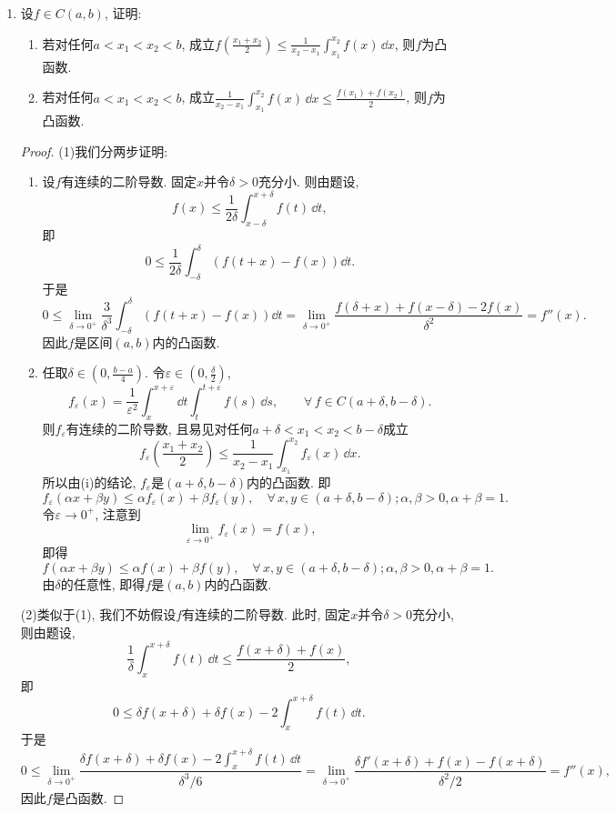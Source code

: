 \begin{quiza}
\begin{enumerate}
\item 设\(f\in C(a,b)\), 证明:
\begin{enumerate}[label=(\roman*)]
\item 若对任何\(a<x_1<x_2<b\), 成立\(f\left(\frac{x_1+x_2}{2}\right)
\leqslant\frac{1}{x_2-x_1}\int_{x_1}^{x_2}f(x)\,\dd x\), 则\(f\)为凸函数.
\item 若对任何\(a<x_1<x_2<b\), 成立\(\frac{1}{x_2-x_1}\int_{x_1}^{x_2}f(x)\,\dd x
\leqslant\frac{f(x_1)+f(x_2)}{2}\), 则\(f\)为凸函数.
\end{enumerate}
\begin{proof}
(1)我们分两步证明:
\begin{enumerate}[label=(\roman*)]
\item 设\(f\)有连续的二阶导数. 固定\(x\)并令\(\delta>0\)充分小. 则由题设,
\[f(x)\leqslant\frac{1}{2\delta}\int_{x-\delta}^{x+\delta}f(t)\,\dd t,\]
即\[0\leqslant\frac{1}{2\delta}\int_{-\delta}^{\delta}\left(f(t+x)-f(x)\right)\dd t.\]
于是\[0\leqslant\lim_{\delta\rightarrow 0^+}\frac{3}{\delta^3}\int_{-\delta}^{\delta}\left(f(t+x)-f(x)\right)\dd t
=\lim_{\delta\rightarrow 0^+}\frac{f(\delta+x)+f(x-\delta)-2f(x)}{\delta^2}=f''(x).\]
因此\(f\)是区间\((a,b)\)内的凸函数.
\item 任取\(\delta\in\left(0,\frac{b-a}{4}\right)\). 
令\(\varepsilon\in\left(0,\frac{\delta}{2}\right)\),
\[f_{\varepsilon}(x)=\frac{1}{\varepsilon^2}\int_{x}^{x+\varepsilon}\dd t\int_{t}^{t+\varepsilon}f(s)\,\dd s,\qquad 
\forall\, f\in C(a+\delta,b-\delta).\]
则\(f_{\varepsilon}\)有连续的二阶导数, 且易见对任何\(a+\delta<x_1<x_2<b-\delta\)成立
\[f_{\varepsilon}\left(\frac{x_1+x_2}{2}\right)
\leqslant\frac{1}{x_2-x_1}\int_{x_1}^{x_2}f_{\varepsilon}(x)\,\dd x.\]
所以由(i)的结论, \(f_{\varepsilon}\)是\((a+\delta,b-\delta)\)内的凸函数. 即
\[f_{\varepsilon}(\alpha x+\beta y)
\leqslant \alpha f_{\varepsilon}(x)+\beta f_{\varepsilon}(y),\quad
\forall\, x,y\in(a+\delta,b-\delta);\alpha,\beta>0,\alpha+\beta=1.\]
令\(\varepsilon\rightarrow 0^+\), 注意到
\[\lim_{\varepsilon\rightarrow 0^+}f_{\varepsilon}(x)=f(x),\]
即得\[f(\alpha x+\beta y)\leqslant \alpha f(x)+\beta f(y),\quad
\forall\, x,y\in(a+\delta,b-\delta);\alpha,\beta>0,\alpha+\beta=1.\]
由\(\delta\)的任意性, 即得\(f\)是\((a,b)\)内的凸函数.
\end{enumerate}

(2)类似于(1), 我们不妨假设\(f\)有连续的二阶导数. 
此时, 固定\(x\)并令\(\delta>0\)充分小, 则由题设,
\[\frac{1}{\delta}\int_{x}^{x+\delta}f(t)\,\dd t
\leqslant\frac{f(x+\delta)+f(x)}{2},\]
即\[0\leqslant\delta f(x+\delta)+\delta f(x)-2\int_{x}^{x+\delta}f(t)\,\dd t.\]
于是\[0\leqslant\lim_{\delta\rightarrow 0^+}\frac{\delta f(x+\delta)+\delta f(x)-2\int_{x}^{x+\delta}f(t)\,\dd t}{\delta^3/6}
=\lim_{\delta\rightarrow 0^+}\frac{\delta f'(x+\delta)+f(x)-f(x+\delta)}{\delta^2/2}=f''(x),\]
因此\(f\)是凸函数.
\end{proof}


\end{enumerate}
\end{quiza}
